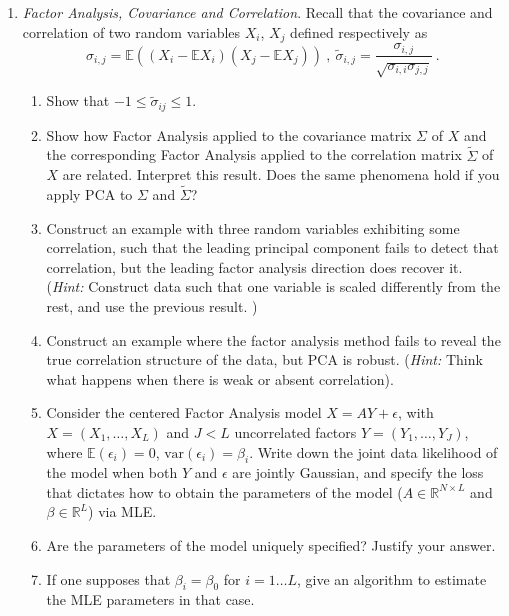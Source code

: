 \documentclass{article}
\newcommand{\E}{\mathbb{E}}
\newcommand{\R}{\mathbb{R}}
\begin{document}
\begin{enumerate}
\item \emph{Factor Analysis, Covariance and Correlation}. 
Recall that the covariance and correlation of two random variables $X_i$, $X_j$ defined respectively as 
$$\sigma_{i,j} = \E( (X_i - \E X_i)(X_j - \E X_j))~,~\tilde{\sigma}_{i,j} = \frac{\sigma_{i,j}}{\sqrt{\sigma_{i,i} \sigma_{j,j}}}~.$$
\begin{enumerate}
\item Show that $-1 \leq \tilde{\sigma}_{ij} \leq 1$.
\item Show how Factor Analysis applied to the covariance matrix $\Sigma$ of $X$ and the corresponding Factor Analysis applied to the correlation matrix $\tilde{\Sigma}$ of $X$ are related. Interpret this result. Does the same phenomena hold 
if you apply PCA to $\Sigma$ and  $\tilde{\Sigma}$? 
\item Construct an example with three random variables exhibiting some correlation, such that the leading principal component fails to detect that correlation, but the leading factor analysis direction does recover it. ({\it Hint:} Construct data such that one variable is scaled differently from the rest, and use the previous result. )
\item Construct an example where the factor analysis method fails to reveal the true correlation structure of the data, but PCA is robust. ({\it Hint:} Think what happens when there is weak or absent correlation).
\item Consider the centered Factor Analysis model $X = AY + \epsilon$, with $X=(X_1,\dots, X_L)$ and $J < L$ uncorrelated factors $Y=(Y_1,\dots,Y_J)$, where $\E(\epsilon_i)=0$, $\text{var}(\epsilon_i) = \beta_i$. 
 Write down the joint data likelihood of the model when both $Y$ and $\epsilon$ are jointly Gaussian, and specify the loss that dictates how to obtain the parameters of the model ($A \in \R^{N \times L}$ and $\beta \in \R^L$) via MLE. 
\item Are the parameters of the model uniquely specified? Justify your answer.
\item If one supposes that $\beta_i = \beta_0$ for $i=1\dots L$, give an algorithm to estimate the MLE parameters in that case.
\end{enumerate}


\end{enumerate}
\end{document}
